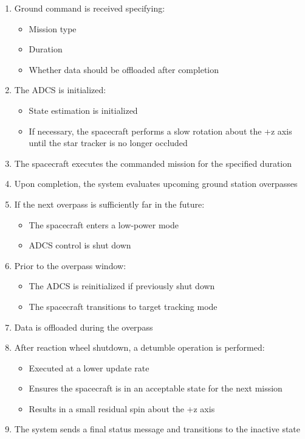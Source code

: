 \documentclass[letterpaper,11pt,oneside,english]{scrreprt}
\begin{document}
	\begin{enumerate}
		\item Ground command is received specifying:
		\begin{itemize}
			\item Mission type
			\item Duration
			\item Whether data should be offloaded after completion
		\end{itemize}
		
		\item The ADCS is initialized:
		\begin{itemize}
			\item State estimation is initialized
			\item If necessary, the spacecraft performs a slow rotation about the +z axis until the star tracker is no longer occluded
		\end{itemize}
		
		\item The spacecraft executes the commanded mission for the specified duration
		
		\item Upon completion, the system evaluates upcoming ground station overpasses
		
		\item If the next overpass is sufficiently far in the future:
		\begin{itemize}
			\item The spacecraft enters a low-power mode
			\item ADCS control is shut down
		\end{itemize}
		
		\item Prior to the overpass window:
		\begin{itemize}
			\item The ADCS is reinitialized if previously shut down
			\item The spacecraft transitions to target tracking mode
		\end{itemize}
		
		\item Data is offloaded during the overpass
		
		\item After reaction wheel shutdown, a detumble operation is performed:
		\begin{itemize}
			\item Executed at a lower update rate
			\item Ensures the spacecraft is in an acceptable state for the next mission
			\item Results in a small residual spin about the +z axis
		\end{itemize}
		
		\item The system sends a final status message and transitions to the inactive state
	\end{enumerate}
	
\end{document}
